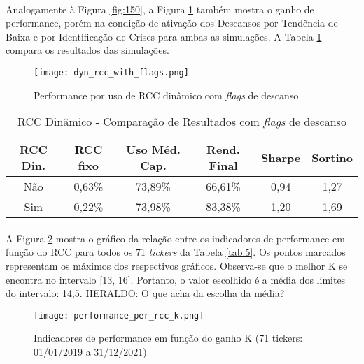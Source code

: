 \paragraph{} Analogamente à Figura \ref{fig:150}, a Figura \ref{fig:151} também mostra o ganho de performance, porém na condição de ativação dos Descansos por Tendência de Baixa e por Identificação de Crises para ambas as simulações. A Tabela \ref{tab:11} compara os resultados das simulações.

\begin{figure}[!htb]
    \texttt{[image: dyn\_rcc\_with\_flags.png]}
    \centering
    \caption{Performance por uso de RCC dinâmico com \textit{flags} de descanso}
    \label{fig:151}
\end{figure}

\begin{table}[h!]
    \begin{center}
        \begin{tabular}{ c|cc|ccc }
            RCC Din. & RCC fixo & Uso Méd. Cap. & Rend. Final & Sharpe & Sortino \\
            \hline
            Não & 0,63\% & 73,89\% & 66,61\% & 0,94 & 1,27 \\
            Sim & 0,22\% & 73,98\% & 83,38\% & 1,20 & 1,69 \\
        \end{tabular}
        \caption{RCC Dinâmico - Comparação de Resultados com \textit{flags} de descanso}
        \label{tab:11}
    \end{center}
\end{table}

\paragraph{} A Figura \ref{fig:560} mostra o gráfico da relação entre os indicadores de performance em função do RCC para todos os 71 \textit{tickers} da Tabela \ref{tab:5}. Os pontos marcados representam os máximos dos respectivos gráficos. Observa-se que o melhor K se encontra no intervalo [13, 16]. Portanto, o valor escolhido é a média dos limites do intervalo: 14,5. \color{red} HERALDO: O que acha da escolha da média? \color{black}

\begin{figure}[!htb]
    \texttt{[image: performance\_per\_rcc\_k.png]}
    \centering
    \caption{Indicadores de performance em função do ganho K (71 tickers: 01/01/2019 a 31/12/2021)}
    \label{fig:560}
\end{figure}



